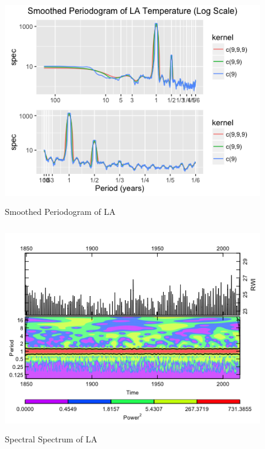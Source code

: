 \documentclass[12pt]{article}
\begin{document}
\begin{figure}[H]
    \centering
    \includegraphics[width=\textwidth, height=9cm]{Figures/laSmooth.png}
    \caption{Smoothed Periodogram of LA}
    \label{fig:laSmooth}
\end{figure}

\begin{figure}
    \centering
    \includegraphics[width=\textwidth, height=9cm]{Figures/laWave.png}
    \caption{Spectral Spectrum of LA}
    \label{fig:laWave}
\end{figure}
\end{document}
